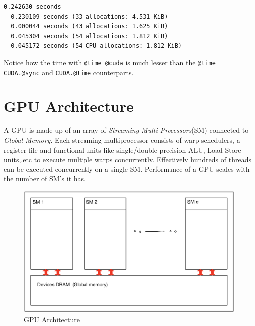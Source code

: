 \documentclass[12pt,a4paper]{article}
\begin{document}
\begin{lstlisting}
0.242630 seconds
  0.230109 seconds (33 allocations: 4.531 KiB)
  0.000044 seconds (43 allocations: 1.625 KiB)
  0.045304 seconds (54 allocations: 1.812 KiB)
  0.045172 seconds (54 CPU allocations: 1.812 KiB)
\end{lstlisting}


Notice how the time with \texttt{@time @cuda} is much lesser than the \texttt{@time CUDA.@sync} and \texttt{CUDA.@time} counterparts.

\section{GPU Architecture}
A GPU is made up of an array of \emph{Streaming Multi-Processors}(SM) connected to \emph{Global Memory}. Each streaming multiprocessor consists of warp schedulers, a register file and functional units like single/double precision ALU, Load-Store units,.etc to execute multiple warps concurrently. Effectively hundreds of threads can be executed concurrently on a single SM. Performance of a GPU scales with the number of SM's it has.

\begin{figure}
\centering
\includegraphics{./assets/GPU_diagram.png}
\caption{GPU Architecture}
\end{figure}
\end{document}
